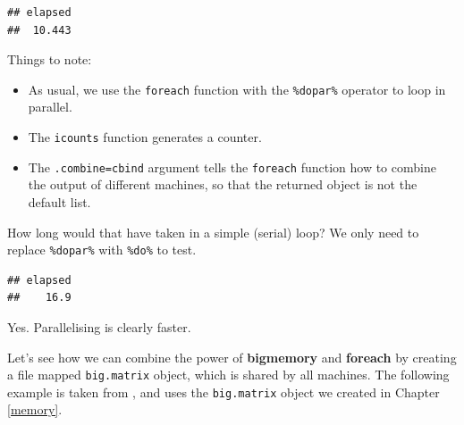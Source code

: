 \documentclass[]{book}
\newenvironment{Shaded}{\begin{snugshade}}{\end{snugshade}}
\newcommand{\DataTypeTok}[1]{\textcolor[rgb]{0.13,0.29,0.53}{#1}}
\newcommand{\DecValTok}[1]{\textcolor[rgb]{0.00,0.00,0.81}{#1}}
\newcommand{\KeywordTok}[1]{\textcolor[rgb]{0.13,0.29,0.53}{\textbf{#1}}}
\newcommand{\NormalTok}[1]{#1}
\newcommand{\OperatorTok}[1]{\textcolor[rgb]{0.81,0.36,0.00}{\textbf{#1}}}
\newcommand{\OtherTok}[1]{\textcolor[rgb]{0.56,0.35,0.01}{#1}}
\newcommand{\StringTok}[1]{\textcolor[rgb]{0.31,0.60,0.02}{#1}}
\providecommand{\tightlist}{%
  \setlength{\itemsep}{0pt}\setlength{\parskip}{0pt}}
\theoremstyle{definition}
\theoremstyle{definition}
\theoremstyle{definition}
\theoremstyle{remark}
\begin{document}
\begin{verbatim}
## elapsed 
##  10.443
\end{verbatim}

Things to note:

\begin{itemize}
\tightlist
\item
  As usual, we use the \texttt{foreach} function with the \texttt{\%dopar\%} operator to loop in parallel.
\item
  The \texttt{icounts} function generates a counter.
\item
  The \texttt{.combine=cbind} argument tells the \texttt{foreach} function how to combine the output of different machines, so that the returned object is not the default list.
\end{itemize}

How long would that have taken in a simple (serial) loop?
We only need to replace \texttt{\%dopar\%} with \texttt{\%do\%} to test.

\begin{Shaded}
\end{Shaded}

\begin{verbatim}
## elapsed 
##    16.9
\end{verbatim}

Yes. Parallelising is clearly faster.

Let's see how we can combine the power of \textbf{bigmemory} and \textbf{foreach} by creating a file mapped \texttt{big.matrix} object, which is shared by all machines.
The following example is taken from \citet{kane2013scalable}, and uses the \texttt{big.matrix} object we created in Chapter \ref{memory}.
\end{document}
